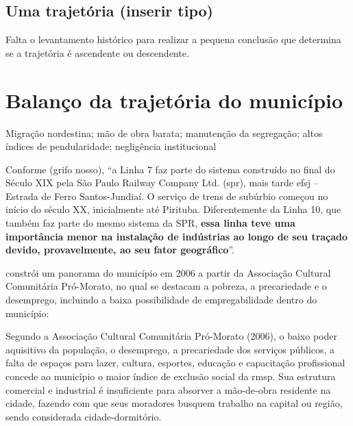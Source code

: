 	\section{Uma trajetória (inserir tipo)}
	
	Falta o levantamento histórico para realizar a pequena conclusão que determina se a trajetória é ascendente ou descendente.
	
	\chapter{Balanço da trajetória do município}
	
	Migração nordestina; mão de obra barata; manutenção da segregação; altos índices de pendularidade; negligência institucional
	
	Conforme  (grifo nosso), ``a Linha 7 faz parte do sistema construído no final do Século XIX pela São Paulo Railway Company Ltd. (\gls{spr}), mais tarde \gls{efsj} – Estrada de Ferro Santos-Jundiaí. O serviço de trens de subúrbio começou no início do século XX, inicialmente até Pirituba. Diferentemente da Linha 10, que também faz parte do mesmo sistema da SPR, \textbf{essa linha teve uma importância menor na instalação de indústrias ao longo de seu traçado devido, provavelmente, ao seu fator geográfico}''.
	
	
	 constrói um panorama do município em 2006 a partir da Associação Cultural Comunitária Pró-Morato, no qual se destacam a pobreza, a precariedade e o desemprego, incluindo a baixa possibilidade de empregabilidade dentro do município:
	
	\begin{citacao}
		Segundo a Associação Cultural Comunitária Pró-Morato (2006), o baixo poder aquisitivo da população, o desemprego, a precariedade dos serviços públicos, a falta de espaços para lazer, cultura, esportes, educação e capacitação profissional concede ao município o maior índice de exclusão social da \gls{rmsp}. Sua estrutura comercial e industrial é insuficiente para absorver a mão-de-obra residente na cidade, fazendo com que seus moradores busquem trabalho na capital ou região, sendo considerada cidade-dormitório.
	\end{citacao}
	
